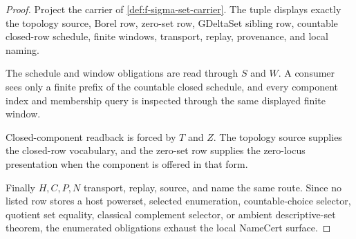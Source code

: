 \begin{proof}
Project the carrier of \autoref{def:f-sigma-set-carrier}. The tuple displays exactly the topology source, Borel row, zero-set row, GDeltaSet sibling row, countable closed-row schedule, finite windows, transport, replay, provenance, and local naming.

The schedule and window obligations are read through $S$ and $W$. A consumer sees only a finite prefix of the countable closed schedule, and every component index and membership query is inspected through the same displayed finite window.

Closed-component readback is forced by $T$ and $Z$. The topology source supplies the closed-row vocabulary, and the zero-set row supplies the zero-locus presentation when the component is offered in that form.

Finally $H,C,P,N$ transport, replay, source, and name the same route. Since no listed row stores a host powerset, selected enumeration, countable-choice selector, quotient set equality, classical complement selector, or ambient descriptive-set theorem, the enumerated obligations exhaust the local NameCert surface.
\end{proof}

